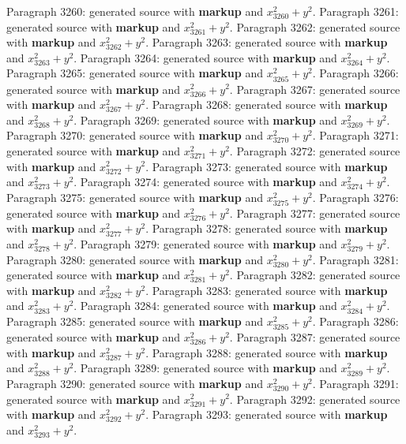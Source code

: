 \documentclass{article}
\begin{document}
Paragraph 3260: generated source with \textbf{markup} and $x_{3260}^2 + y^2$.
Paragraph 3261: generated source with \textbf{markup} and $x_{3261}^2 + y^2$.
Paragraph 3262: generated source with \textbf{markup} and $x_{3262}^2 + y^2$.
Paragraph 3263: generated source with \textbf{markup} and $x_{3263}^2 + y^2$.
Paragraph 3264: generated source with \textbf{markup} and $x_{3264}^2 + y^2$.
Paragraph 3265: generated source with \textbf{markup} and $x_{3265}^2 + y^2$.
Paragraph 3266: generated source with \textbf{markup} and $x_{3266}^2 + y^2$.
Paragraph 3267: generated source with \textbf{markup} and $x_{3267}^2 + y^2$.
Paragraph 3268: generated source with \textbf{markup} and $x_{3268}^2 + y^2$.
Paragraph 3269: generated source with \textbf{markup} and $x_{3269}^2 + y^2$.
Paragraph 3270: generated source with \textbf{markup} and $x_{3270}^2 + y^2$.
Paragraph 3271: generated source with \textbf{markup} and $x_{3271}^2 + y^2$.
Paragraph 3272: generated source with \textbf{markup} and $x_{3272}^2 + y^2$.
Paragraph 3273: generated source with \textbf{markup} and $x_{3273}^2 + y^2$.
Paragraph 3274: generated source with \textbf{markup} and $x_{3274}^2 + y^2$.
Paragraph 3275: generated source with \textbf{markup} and $x_{3275}^2 + y^2$.
Paragraph 3276: generated source with \textbf{markup} and $x_{3276}^2 + y^2$.
Paragraph 3277: generated source with \textbf{markup} and $x_{3277}^2 + y^2$.
Paragraph 3278: generated source with \textbf{markup} and $x_{3278}^2 + y^2$.
Paragraph 3279: generated source with \textbf{markup} and $x_{3279}^2 + y^2$.
Paragraph 3280: generated source with \textbf{markup} and $x_{3280}^2 + y^2$.
Paragraph 3281: generated source with \textbf{markup} and $x_{3281}^2 + y^2$.
Paragraph 3282: generated source with \textbf{markup} and $x_{3282}^2 + y^2$.
Paragraph 3283: generated source with \textbf{markup} and $x_{3283}^2 + y^2$.
Paragraph 3284: generated source with \textbf{markup} and $x_{3284}^2 + y^2$.
Paragraph 3285: generated source with \textbf{markup} and $x_{3285}^2 + y^2$.
Paragraph 3286: generated source with \textbf{markup} and $x_{3286}^2 + y^2$.
Paragraph 3287: generated source with \textbf{markup} and $x_{3287}^2 + y^2$.
Paragraph 3288: generated source with \textbf{markup} and $x_{3288}^2 + y^2$.
Paragraph 3289: generated source with \textbf{markup} and $x_{3289}^2 + y^2$.
Paragraph 3290: generated source with \textbf{markup} and $x_{3290}^2 + y^2$.
Paragraph 3291: generated source with \textbf{markup} and $x_{3291}^2 + y^2$.
Paragraph 3292: generated source with \textbf{markup} and $x_{3292}^2 + y^2$.
Paragraph 3293: generated source with \textbf{markup} and $x_{3293}^2 + y^2$.
\end{document}
